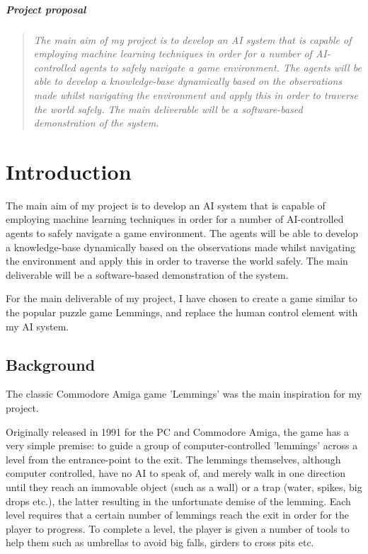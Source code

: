 \documentclass[a4paper,oneside]{report}
\begin{document}
\paragraph{Project proposal}

\begin{quotation}
\emph{The main aim of my project is to develop an AI system that is capable of employing machine learning techniques in order for a number of AI-controlled agents to safely navigate a game environment.
The agents will be able to develop a knowledge-base dynamically based on the observations made whilst navigating the environment and apply this in order to traverse the world safely.
The main deliverable will be a software-based demonstration of the system.}
\end{quotation}

\chapter{Introduction}

The main aim of my project is to develop an AI system that is capable of employing machine learning techniques in order for a number of AI-controlled agents to safely navigate a game environment. The agents will be able to develop a knowledge-base dynamically based on the observations made whilst navigating the environment and apply this in order to traverse the world safely. The main deliverable will be a software-based demonstration of the system.

For the main deliverable of my project, I have chosen to create a game similar to the popular puzzle game Lemmings, and replace the human control element with my AI system.

\section{Background}

The classic Commodore Amiga game 'Lemmings' was the main inspiration for my project.

Originally released in 1991 for the PC and Commodore Amiga, the game has a very simple premise: to guide a group of computer-controlled ’lemmings’ across a level from the entrance-point to the exit. The lemmings themselves, although computer controlled, have no AI to speak of, and merely walk in one direction until they reach an immovable object (such as a wall) or a trap (water, spikes, big drops etc.), the latter resulting in the unfortunate demise of the lemming. Each level requires that a certain number of lemmings reach the exit in order for the player to progress. To complete a level, the player is given a number of tools to help them such as umbrellas to avoid big falls, girders to cross pits etc.
		
\end{document}
